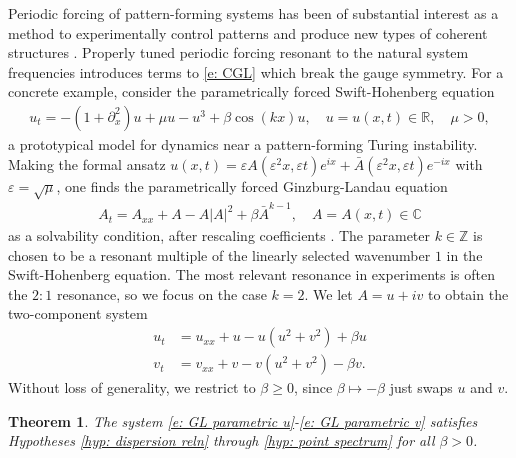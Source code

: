 \documentclass[11pt]{article}
\newcommand{\eps}{\varepsilon}
\newcommand{\Z}{\mathbb{Z}}
\newcommand{\R}{\mathbb{R}}
\newcommand{\C}{\mathbb{C}}
\newtheorem{thmlocal}[prop]{Theorem}
\numberwithin{equation}{section}
\numberwithin{prop}{section}
\begin{document}
Periodic forcing of pattern-forming systems has been of substantial interest as a method to experimentally control patterns and produce new types of coherent structures \cite{Parametric1, Parametric2, Parametric3, ParametricForcingLiquidCrystal, ParametricForcingRayleighBenard}. Properly tuned periodic forcing resonant to the natural system frequencies introduces terms to \eqref{e: CGL} which break the gauge symmetry. For a concrete example, consider the parametrically forced Swift-Hohenberg equation
\begin{align}
u_t = -(1+\partial_x^2) u + \mu u - u^3 + \beta \cos (k x) u,  \quad u = u(x,t) \in \R, \quad \mu > 0,
\end{align}
a prototypical model for dynamics near a pattern-forming Turing instability. Making the formal ansatz $u(x,t) = \eps A(\eps^2 x, \eps t) e^{i x} + \bar{A}(\eps^2 x, \eps t) e^{-ix}$ with $\eps = \sqrt{\mu}$, one finds the parametrically forced Ginzburg-Landau equation
\begin{align}
A_t = A_{xx} + A -A|A|^2 + \beta \bar{A}^{k-1}, \quad A = A(x,t) \in \C \label{e: GL parametric}
\end{align}
as a solvability condition, after rescaling coefficients \cite{ParametricMeron}. The parameter $k \in \Z$ is chosen to be a resonant multiple of the linearly selected wavenumber $1$ in the Swift-Hohenberg equation. The most relevant resonance in experiments is often the $2:1$ resonance, so we focus on the case $k = 2$.
We let $A = u + iv$ to obtain the two-component system
\begin{align}
u_t &= u_{xx} + u - u(u^2 + v^2) + \beta u \label{e: GL parametric u} \\
v_t &= v_{xx} + v - v(u^2 + v^2) - \beta v. \label{e: GL parametric v}
\end{align}
Without loss of generality, we restrict to $\beta \geq 0$, since $\beta \mapsto -\beta$ just swaps $u$ and $v$.
\begin{thmlocal}
	The system \eqref{e: GL parametric u}-\eqref{e: GL parametric v} satisfies Hypotheses \ref{hyp: dispersion reln} through \ref{hyp: point spectrum} for all $\beta > 0$. 
\end{thmlocal}
\end{document}
